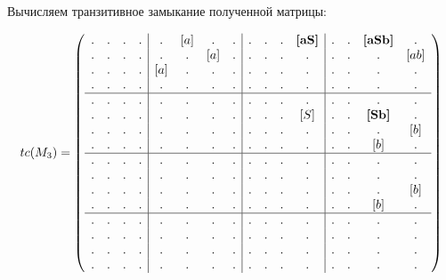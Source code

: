 \begin{example}
Вычисляем транзитивное замыкание полученной матрицы:

\begin{align}
tc(M_3) =
\left(\begin{array}{c c c c | c c c c | c c c c | c c c c } 
. & . & . & .  &  . & [a] & . & .  &  . & . & . & \textbf{[aS]}  &  . & . & \textbf{[aSb]} & .   \\
. & . & . & .  &  . & . & [a] & .  &  . & . & . & .              &  . & . & .              & [ab]   \\
. & . & . & .  &  [a] & . & . & .  &  . & . & . & .              &  . & . & .              & .   \\
. & . & . & .  &  . & . & . & .    &  . & . & . & .              &  . & . & .              & .   \\
\hline
. & . & . & .  &  . & . & . & .    &  . & . & . & .              &  . & . & . & .    \\
. & . & . & .  &  . & . & . & .    &  . & . & . & [S]            &  . & . & \textbf{[Sb]}    & .    \\
. & . & . & .  &  . & . & . & .    &  . & . & . & .              &  . & . & .    & [b]  \\
. & . & . & .  &  . & . & . & .    &  . & . & . & .              &  . & . & [b]  & .    \\
\hline                                                              
. & . & . & .  &  . & . & . & .    &  . & . & . & .              &  . & . & . & .   \\
. & . & . & .  &  . & . & . & .    &  . & . & . & .              &  . & . & . & .   \\
. & . & . & .  &  . & . & . & .    &  . & . & . & .              &  . & . & . & [b] \\
. & . & . & .  &  . & . & . & .    &  . & . & . & .              &  . & . & [b] & . \\
\hline                                                              
. & . & . & .  &  . & . & . & .    &  . & . & . & .              &  . & . & . & .   \\
. & . & . & .  &  . & . & . & .    &  . & . & . & .              &  . & . & . & .   \\
. & . & . & .  &  . & . & . & .    &  . & . & . & .              &  . & . & . & .   \\
. & . & . & .  &  . & . & . & .    &  . & . & . & .              &  . & . & . & . 
\end{array}\right)
\end{align}


\end{example}
